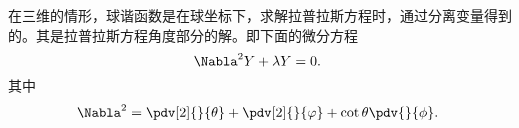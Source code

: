 

在三维的情形，球谐函数是在球坐标下，求解拉普拉斯方程时，通过分离变量得到的。其是拉普拉斯方程角度部分的解。即下面的微分方程
\begin{equation}
\Nabla^2 Y+\lambda Y=0.~
\end{equation}
其中 
\begin{equation}
\Nabla^2=\pdv[2]{}{\theta}+\pdv[2]{}{\varphi}+\cot\theta\pdv{}{\phi}.~
\end{equation}











